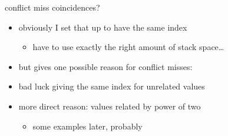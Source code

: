 \begin{frame}{conflict miss coincidences?}
\begin{itemize}
\item obviously I set that up to have the same index 
    \begin{itemize}
    \item have to use exactly the right amount of stack space\ldots
    \end{itemize}
\item but gives one possible reason for conflict misses:
\item bad luck giving the same index for unrelated values
\vspace{.5cm}
\item more direct reason: values related by power of two
    \begin{itemize}
    \item some examples later, probably
    \end{itemize}
\end{itemize}
\end{frame}
